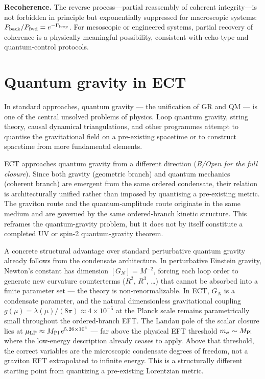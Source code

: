 \documentclass[11pt,a4paper]{article}
\begin{document}
\textbf{Recoherence.} The reverse process---partial reassembly of coherent integrity---is not forbidden in principle but exponentially suppressed for macroscopic systems: $P_{\rm back}/P_{\rm fwd} = e^{-\Gamma_{\rm loop}}$. For mesoscopic or engineered systems, partial recovery of coherence is a physically meaningful possibility, consistent with echo-type and quantum-control protocols.


\section{Quantum gravity in ECT}
\label{sec:pop_qg}

In standard approaches, quantum gravity --- the unification of GR and QM --- is one of the central unsolved problems of physics. Loop quantum gravity, string theory, causal dynamical triangulations, and other programmes attempt to quantise the gravitational field on a pre-existing spacetime or to construct spacetime from more fundamental elements.

ECT approaches quantum gravity from a different direction (\emph{B/Open for the full closure}). Since both gravity (geometric branch) and quantum mechanics (coherent branch) are emergent from the same ordered condensate, their relation is architecturally unified rather than imposed by quantising a pre-existing metric. The graviton route and the quantum-amplitude route originate in the same medium and are governed by the same ordered-branch kinetic structure. This reframes the quantum-gravity problem, but it does not by itself constitute a completed UV or spin-2 quantum-gravity theorem.

A concrete structural advantage over standard perturbative quantum gravity already follows from the condensate architecture. In perturbative Einstein gravity, Newton's constant has dimension $[G_N]=M^{-2}$, forcing each loop order to generate new curvature counterterms ($R^2$, $R^3$, \ldots) that cannot be absorbed into a finite parameter set --- the theory is non-renormalizable. In ECT, $G_N$ is a condensate parameter, and the natural dimensionless gravitational coupling $g(\mu)=\lambda(\mu)/(8\pi)\approx 4\times10^{-5}$ at the Planck scale remains parametrically small throughout the ordered-branch EFT. The Landau pole of the scalar closure lies at $\mu_{\rm LP}\approx M_{\rm Pl}\,e^{5.26\times10^4}$ --- far above the physical EFT threshold $m_\sigma\sim M_{\rm Pl}$ where the low-energy description already ceases to apply. Above that threshold, the correct variables are the microscopic condensate degrees of freedom, not a graviton EFT extrapolated to infinite energy. This is a structurally different starting point from quantizing a pre-existing Lorentzian metric.
\end{document}
